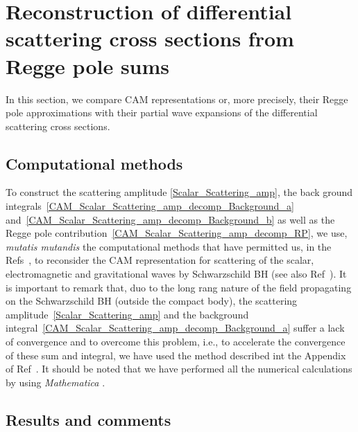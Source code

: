 \documentclass[aps,prd,longbibliography,reprint,twocolumn,amsmath,amssymb,amsfonts,showpacs,superscriptaddress]{revtex4-1}%
\begin{document}
\section{Reconstruction of differential scattering cross sections from Regge pole sums}
\label{SecIII}

In this section,  we compare CAM representations or, more precisely, their Regge pole approximations with their partial wave expansions of the differential scattering cross sections.

\subsection{Computational methods}
\label{SecIIIa}

To construct the scattering amplitude \eqref{Scalar_Scattering_amp}, the back ground integrals~\eqref{CAM_Scalar_Scattering_amp_decomp_Background_a} and~\eqref{CAM_Scalar_Scattering_amp_decomp_Background_b} as well as the Regge pole contribution~\eqref{CAM_Scalar_Scattering_amp_decomp_RP}, we use, \textit{mutatis mutandis} the computational methods that have permitted us, in the Refs~\cite{Folacci:2019cmc,Folacci:2019vtt}, to reconsider the CAM representation for scattering of the scalar, electromagnetic and gravitational waves by Schwarzschild BH (see also Ref~\cite{Dolan:2017rtj}). It is important to remark that, duo to the long rang nature of the field propagating on the Schwarzschild BH (outside the compact body), the scattering amplitude~\eqref{Scalar_Scattering_amp} and the background integral~\eqref{CAM_Scalar_Scattering_amp_decomp_Background_a} suffer a lack of convergence and to overcome this problem, i.e., to accelerate the convergence of these sum and integral, we have used the method described int the Appendix of Ref~\cite{Folacci:2019cmc}. It should be noted that we have performed all the numerical calculations by using {\it Mathematica} \cite{Mathematica}.


\subsection{Results and comments}
\label{SecIIIb}
\end{document}
